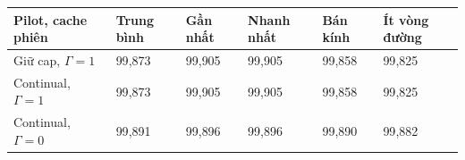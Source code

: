 \par\smallskip\noindent\begin{tabularx}{\linewidth}{@{}P{4.2cm}XXXXX@{}}\toprule
\textbf{Pilot, cache phiên} & \textbf{Trung bình} & \textbf{Gần nhất} & \textbf{Nhanh nhất} & \textbf{Bán kính} & \textbf{Ít vòng đường} \\
\midrule
Giữ cap, $\Gamma=1$ & 99{,}873 & 99{,}905 & 99{,}905 & 99{,}858 & 99{,}825 \\
Continual, $\Gamma=1$ & 99{,}873 & 99{,}905 & 99{,}905 & 99{,}858 & 99{,}825 \\
Continual, $\Gamma=0$ & 99{,}891 & 99{,}896 & 99{,}896 & 99{,}890 & 99{,}882 \\
\bottomrule\end{tabularx}\par\smallskip
